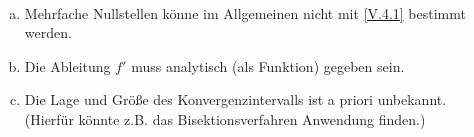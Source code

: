 \begin{Beme}~
  \begin{enumerate}[a)]
  \item Mehrfache Nullstellen könne im Allgemeinen
    nicht mit \eqref{V.4.1} bestimmt werden.
  \item Die Ableitung $f'$ muss analytisch (als Funktion) gegeben sein.
  \item Die Lage und Größe des Konvergenzintervalls ist a priori unbekannt.\\
    (Hierfür könnte z.B. das Bisektionsverfahren Anwendung finden.)
  \end{enumerate}
\end{Beme}





